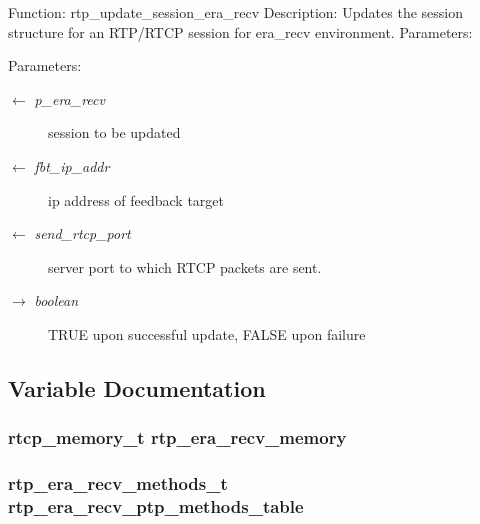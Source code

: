 Function: rtp\_\-update\_\-session\_\-era\_\-recv Description: Updates the session structure for an RTP/RTCP session for era\_\-recv environment. Parameters: \begin{Desc}
\item[Parameters:]
\begin{description}
\item[\mbox{$\leftarrow$} {\em p\_\-era\_\-recv}]session to be updated \item[\mbox{$\leftarrow$} {\em fbt\_\-ip\_\-addr}]ip address of feedback target \item[\mbox{$\leftarrow$} {\em send\_\-rtcp\_\-port}]server port to which RTCP packets are sent. \item[\mbox{$\rightarrow$} {\em boolean}]TRUE upon successful update, FALSE upon failure \end{description}
\end{Desc}


\subsection{Variable Documentation}
\subsubsection{\setlength{\rightskip}{0pt plus 5cm}rtcp\_\-memory\_\-t \bf{rtp\_\-era\_\-recv\_\-memory}\hspace{0.3cm}{\tt  [static]}}\label{rtp__era__recv_8c_d6054c0214717de3ea287daa7114f925}


\subsubsection{\setlength{\rightskip}{0pt plus 5cm}\bf{rtp\_\-era\_\-recv\_\-methods\_\-t} \bf{rtp\_\-era\_\-recv\_\-ptp\_\-methods\_\-table}\hspace{0.3cm}{\tt  [static]}}\label{rtp__era__recv_8c_d196cba8d3297491ef28fc0af4c568a7}


